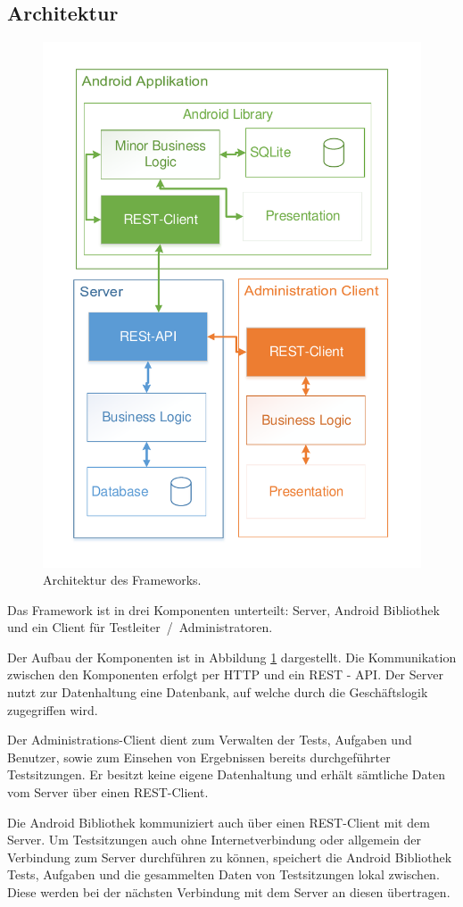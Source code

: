 \subsection{Architektur}\label{subsec:architektur}

\begin{figure}
	\centering
	\includegraphics[width=\linewidth]{img/architecture_draft}
	\caption{Architektur des Frameworks.}
	\label{fig:architektur_entwurf}
\end{figure}
Das Framework ist in drei Komponenten unterteilt: Server, Android Bibliothek und ein Client für Testleiter~/~Administratoren.

Der Aufbau der Komponenten ist in Abbildung \ref{fig:architektur_entwurf} dargestellt.
Die Kommunikation zwischen den Komponenten erfolgt per \ac{HTTP} und ein \ac{REST} - \ac{API}.
Der Server nutzt zur Datenhaltung eine Datenbank, auf welche durch die Geschäftslogik zugegriffen wird.

Der Administrations-Client dient zum Verwalten der Tests, Aufgaben und Benutzer, sowie zum Einsehen von Ergebnissen bereits durchgeführter Testsitzungen.
Er besitzt keine eigene Datenhaltung und erhält sämtliche Daten vom Server über einen \ac{REST}-Client.

Die Android Bibliothek kommuniziert auch über einen \ac{REST}-Client mit dem Server.
Um Testsitzungen auch ohne Internetverbindung oder allgemein der Verbindung zum Server durchführen zu können, speichert die Android Bibliothek Tests, Aufgaben und die gesammelten Daten von Testsitzungen lokal zwischen.
Diese werden bei der nächsten Verbindung mit dem Server an diesen übertragen.